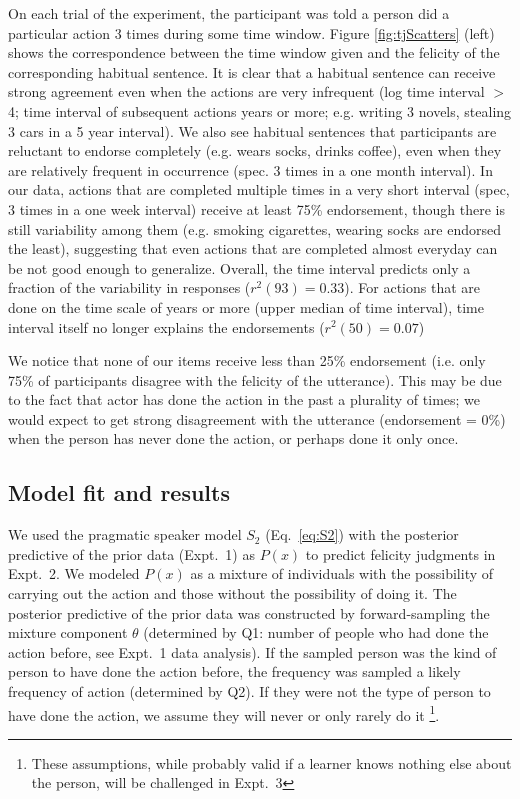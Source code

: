 \documentclass[10pt,letterpaper]{article}
\begin{document}
On each trial of the experiment, the participant was told a person did a particular action 3 times during some time window. 
Figure \ref{fig:tjScatters} (left) shows the correspondence between the time window given and the felicity of the corresponding habitual sentence. 
It is clear that a habitual sentence can receive strong agreement even when the actions are very infrequent (log time interval $>$ 4; time interval of subsequent actions years or more; e.g. writing 3 novels, stealing 3 cars in a 5 year interval).
We also see habitual sentences that participants are reluctant to endorse completely (e.g. wears socks, drinks coffee), even when they are relatively frequent in occurrence (spec. 3 times in a one month interval).
In our data, actions that are completed multiple times in a very short interval (spec, 3 times in a one week interval) receive at least 75\% endorsement, though there is still variability among them (e.g. smoking cigarettes, wearing socks are endorsed the least), suggesting that even actions that are completed almost everyday can be not good enough to generalize.
Overall, the time interval predicts only a fraction of the variability in responses ($r^2(93) = 0.33$).
For actions that are done on the time scale of years or more (upper median of time interval), time interval itself no longer explains the endorsements  ($r^2(50) = 0.07$)

We notice that none of our items receive less than 25\% endorsement (i.e. only 75\% of participants disagree with the felicity of the utterance).
This may be due to the fact that actor has done the action in the past a plurality of times; we would expect to get strong disagreement with the utterance (endorsement = 0\%) when the person has never done the action, or perhaps done it only once.

\subsection{Model fit and results}

We used the pragmatic speaker model $S_2$ (Eq.~\ref{eq:S2}) with the posterior predictive of the prior data (Expt.~1) as $P(x)$  to predict felicity judgments in Expt.~2.
We modeled $P(x)$ as a mixture of individuals with the possibility of carrying out the action and those without the possibility of doing it. 
The posterior predictive of the prior data was constructed by forward-sampling the mixture component $\theta$ (determined by Q1: number of people who had done the action before, see Expt.~1 data analysis).
If the sampled person was the kind of person to have done the action before, the frequency was sampled a likely frequency of action (determined by Q2). 
If they were not the type of person to have done the action, we assume they will never or only rarely do it
\footnote{These assumptions, while probably valid if a learner knows nothing else about the person, will be challenged in Expt.~3}.
\end{document}

